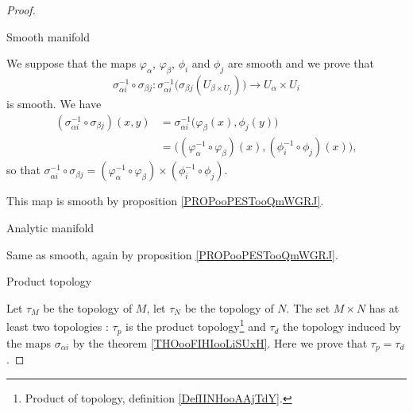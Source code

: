 \begin{proof}
	\begin{proofpart}
		Smooth manifold
	\end{proofpart}
	We suppose that the maps \( \varphi_{\alpha}\), \( \varphi_{\beta}\), \( \phi_i\) and \( \phi_j\) are smooth and we prove that
	\begin{equation}
		\sigma_{\alpha i}^{-1}\circ \sigma_{\beta j} \colon \sigma_{\alpha i}^{-1}\Big( \sigma_{\beta j}(U_{\beta\times U_j}) \Big)\to U_{\alpha}\times U_i
	\end{equation}
	is smooth. We have
	\begin{subequations}
		\begin{align}
			(\sigma_{\alpha i}^{-1}\circ\sigma_{\beta j})(x,y) & =\sigma_{\alpha i}^{-1}\big( \varphi_{\beta}(x), \phi_j(y) \big)                         \\
			                                                   & =\Big( (\varphi_{\alpha}^{-1}\circ\varphi_{\beta})(x),(\phi_i^{-1}\circ\phi_j)(x) \Big),
		\end{align}
	\end{subequations}
	so that \( \sigma_{\alpha i}^{-1}\circ\sigma_{\beta j}=(\varphi_{\alpha}^{-1}\circ\varphi_{\beta})\times (\phi_i^{-1}\circ \phi_j)\).

	This map is smooth by proposition \ref{PROPooPESTooQmWGRJ}.
	\begin{proofpart}
		Analytic manifold
	\end{proofpart}
	Same as smooth, again by proposition \ref{PROPooPESTooQmWGRJ}.
	\begin{proofpart}
		Product topology
	\end{proofpart}
	Let \( \tau_M\) be the topology of \( M\), let \( \tau_N\) be the topology of \( N\). The set \( M\times N\) has at least two topologies : \( \tau_p\) is the product topology\footnote{Product of topology, definition \ref{DefIINHooAAjTdY}.} and \( \tau_d\) the topology induced by the maps \( \sigma_{\alpha i}\) by the theorem \ref{THOooFIHIooLiSUxH}. Here we prove that \( \tau_p=\tau_d\).


\end{proof}
